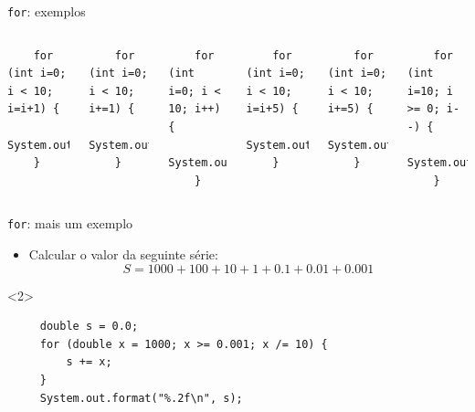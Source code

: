 \documentclass[portuguese, aspectratio=169, xcolor=table]{beamer}
\begin{document}
\begin{frame}[fragile]{\texttt{for}: exemplos}
\begin{columns}
\begin{verbatim}
    for (int i=0; i < 10; i=i+1) {
        System.out.println(i);
    }
\end{verbatim}
\begin{verbatim}
    for (int i=0; i < 10; i+=1) {
        System.out.println(i);
    }
\end{verbatim}
\begin{verbatim}
    for (int i=0; i < 10; i++) {
        System.out.println(i);
    }
\end{verbatim}
\begin{verbatim}
    for (int i=0; i < 10; i=i+5) {
        System.out.println(i);
    }
\end{verbatim}
\begin{verbatim}
    for (int i=0; i < 10; i+=5) {
        System.out.println(i);
    }
\end{verbatim}
\begin{verbatim}
    for (int i=10; i >= 0; i--) {
        System.out.println(i);
    }
\end{verbatim}
\end{columns}

\end{frame}

\begin{frame}[fragile]{\texttt{for}: mais um exemplo}
\begin{itemize}
    \item Calcular o valor da seguinte série:
    $$S = 1000 + 100 + 10 + 1 + 0.1 + 0.01 + 0.001$$
\end{itemize}
\begin{onlyenv}<2>
 \begin{verbatim}
     double s = 0.0;
     for (double x = 1000; x >= 0.001; x /= 10) {
         s += x;
     }
     System.out.format("%.2f\n", s);
 \end{verbatim}
\end{onlyenv}

\end{frame}
\end{document}
